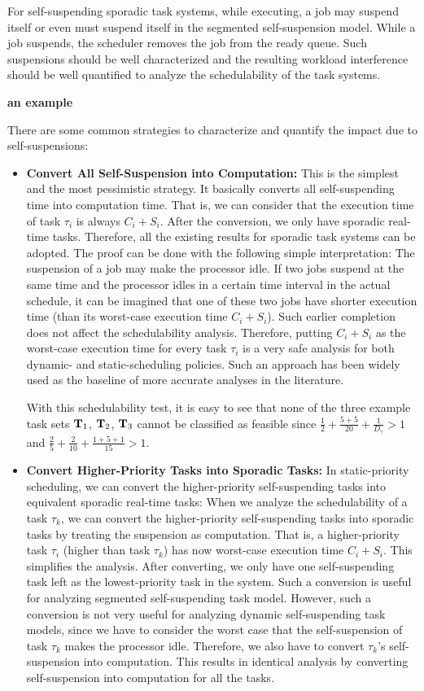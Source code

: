 For self-suspending sporadic task systems, while executing, a job may suspend itself or even must suspend itself in the segmented self-suspension model. While a job suspends, the scheduler removes the job from the ready queue. Such suspensions should be well characterized and the resulting workload interference should be well quantified to analyze the schedulability of the task systems. 

{\bf an example}

There are some common strategies to characterize and quantify the impact due to self-suspensions:
\begin{itemize}
\item {\bf Convert All Self-Suspension into Computation:} This is the simplest and the most pessimistic strategy. It basically converts all self-suspending time into computation time. That is, we can consider that the execution time of task $\tau_i$ is always $C_i+S_i$. After the conversion, we only have sporadic real-time tasks. Therefore, all the existing results for sporadic task systems can be adopted. The proof can be done with the following simple interpretation: The suspension of a job may make the processor idle. If two jobs suspend at the same time and the processor idles in a certain time interval in the actual schedule, it can be imagined that one of these two jobs have shorter execution time (than its worst-case execution time $C_i+S_i$). Such earlier completion does not affect the schedulability analysis. Therefore, putting $C_i+S_i$ as the worst-case execution time for every task $\tau_i$ is a very safe analysis for both dynamic- and static-scheduling policies.  Such an approach has been widely used as the baseline of more accurate analyses in the literature.

With this schedulability test, it is easy to see that none of the three example task sets ${\bf T}_1$, ${\bf T}_2$, ${\bf T}_3$ cannot be classified as feasible since $\frac{1}{2} + \frac{5+5}{20} + \frac{1}{D_\gamma} > 1$ and $\frac{2}{5}+\frac{2}{10}+\frac{1+5+1}{15} > 1$.

\item {\bf Convert Higher-Priority Tasks into Sporadic Tasks:} In static-priority scheduling, we can convert the higher-priority self-suspending tasks into equivalent sporadic real-time tasks: When we analyze the schedulability of a task $\tau_k$, we can convert the higher-priority self-suspending tasks into sporadic tasks by treating the suspension as computation. That is, a higher-priority task $\tau_i$ (higher than task $\tau_k$) has now worst-case execution time $C_i+S_i$. This simplifies the analysis. After converting, we only have one self-suspending task left as the lowest-priority task in the system.  Such a conversion is useful for analyzing segmented self-suspending task model. However, such a conversion is not very useful for analyzing dynamic self-suspending task models, since we have to consider the worst case that the self-suspension of task $\tau_k$ makes the processor idle. Therefore, we also have to convert $\tau_k$'s self-suspension into computation. This results in identical analysis by converting self-suspension into computation for all the tasks. 


\end{itemize}
